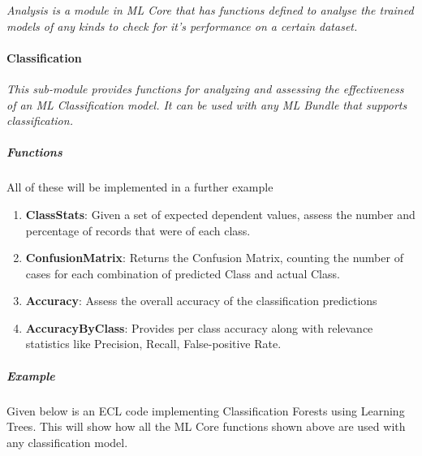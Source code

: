 \documentclass[a4paper,oneside,12pt]{book}
\begin{document}
\textit{Analysis is a module in ML Core that has functions defined to analyse the trained models of any kinds to check for it's performance on a certain dataset. }

\paragraph{Classification}\label{analysis:classification}

\textit{This sub-module provides functions for analyzing and assessing the effectiveness of an ML Classification model. It can be used with any ML Bundle that supports classification.}

\subparagraph{Functions}

All of these will be implemented in a further example

\begin{enumerate}
    \item \textbf{ClassStats}: Given a set of expected dependent values, assess the number and percentage of records that were of each class.
    \item \textbf{ConfusionMatrix}: Returns the Confusion Matrix, counting the number of cases for each combination of predicted Class and actual Class.
    \item \textbf{Accuracy}: Assess the overall accuracy of the classification predictions
    \item \textbf{AccuracyByClass}: Provides per class accuracy along with relevance statistics like Precision, Recall, False-positive Rate.
\end{enumerate}

\subparagraph{Example}\label{classification:example}

Given below is an ECL code implementing Classification Forests using Learning Trees. This will show how all the ML Core functions shown above are used with any classification model.
\end{document}
